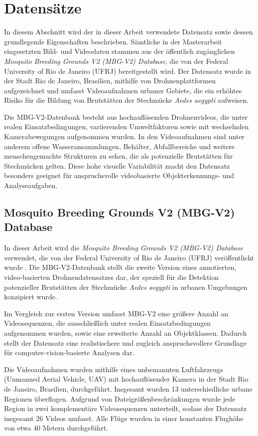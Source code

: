 \section{Datensätze}

In diesem Abschnitt wird der in dieser Arbeit verwendete Datensatz sowie dessen
grundlegende Eigenschaften beschrieben. Sämtliche in der Masterarbeit eingesetzten
Bild- und Videodaten stammen aus der öffentlich zugänglichen
\textit{Mosquito Breeding Grounds V2 (MBG-V2) Database}, die von der
Federal University of Rio de Janeiro (UFRJ) bereitgestellt wird. Der Datensatz
wurde in der Stadt Rio de Janeiro, Brasilien, mithilfe von Drohnenplattformen
aufgezeichnet und umfasst Videoaufnahmen urbaner Gebiete, die ein erhöhtes
Risiko für die Bildung von Brutstätten der Stechmücke \textit{Aedes aegypti}
aufweisen.

Die MBG-V2-Datenbank besteht aus hochauflösenden Drohnenvideos, die unter realen
Einsatzbedingungen, variierenden Umweltfaktoren sowie mit wechselnden
Kamerabewegungen aufgenommen wurden. In den Videoaufnahmen sind unter anderem
offene Wasseransammlungen, Behälter, Abfallbereiche und weitere menschengemachte
Strukturen zu sehen, die als potenzielle Brutstätten für Stechmücken gelten.
Diese hohe visuelle Variabilität macht den Datensatz besonders geeignet für
anspruchsvolle videobasierte Objekterkennungs- und Analyseaufgaben.

\subsection{Mosquito Breeding Grounds V2 (MBG-V2) Database}

In dieser Arbeit wird die \textit{Mosquito Breeding Grounds V2 (MBG-V2) Database}
verwendet, die von der Federal University of Rio de Janeiro (UFRJ) veröffentlicht
wurde \cite{passos2024mbgv2}. Die MBG-V2-Datenbank stellt die zweite Version eines
annotierten, video-basierten Drohnendatensatzes dar, der speziell für die
Detektion potenzieller Brutstätten der Stechmücke \textit{Aedes aegypti} in
urbanen Umgebungen konzipiert wurde.

Im Vergleich zur ersten Version umfasst MBG-V2 eine größere Anzahl an
Videosequenzen, die ausschließlich unter realen Einsatzbedingungen aufgenommen
wurden, sowie eine erweiterte Anzahl an Objektklassen. Dadurch stellt der
Datensatz eine realistischere und zugleich anspruchsvollere Grundlage für
computer-vision-basierte Analysen dar.

Die Videoaufnahmen wurden mithilfe eines unbemannten Luftfahrzeugs
(Unmanned Aerial Vehicle, UAV) mit hochauflösender Kamera in der Stadt
Rio de Janeiro, Brasilien, durchgeführt. Insgesamt wurden 13 unterschiedliche
urbane Regionen überflogen. Aufgrund von Dateigrößenbeschränkungen wurde jede
Region in zwei komplementäre Videosequenzen unterteilt, sodass der Datensatz
insgesamt 26 Videos umfasst. Alle Flüge wurden in einer konstanten Flughöhe von
etwa 40 Metern durchgeführt.

